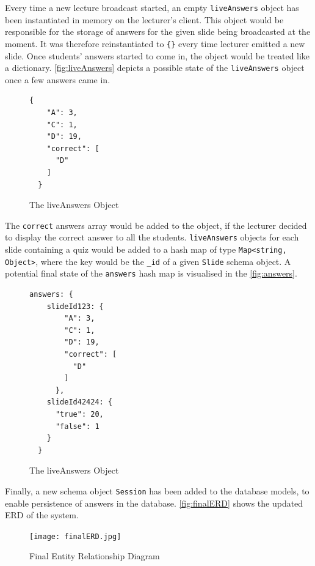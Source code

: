Every time a new lecture broadcast
started, an empty \texttt{liveAnswers} object has been instantiated in memory on the lecturer's
client. This object would be responsible for the storage of answers for the given slide
being broadcasted at the moment. It was therefore reinstantiated to \texttt{\{\}} every time
lecturer emitted a new slide. Once students' answers started to come in, the object would be treated
like a dictionary. \autoref{fig:liveAnswers} depicts a possible state of the \texttt{liveAnswers}
object once a few answers came in.

\begin{figure}[h!]
  \begin{lstlisting}[basicstyle=\small]
  {
    "A": 3,
    "C": 1,
    "D": 19,
    "correct": [
      "D"
    ]
  }
  \end{lstlisting}
  \caption{The liveAnswers Object}
  \label{fig:liveAnswers}
\end{figure}

The \texttt{correct} answers array would be added to the object, if the lecturer decided to
display the correct answer to all the students. \texttt{liveAnswers} objects for each
slide containing a quiz would be added to a hash map of type \texttt{Map<string, Object>}, where
the key would be the \texttt{\_id} of a given \texttt{Slide} schema object. A potential
final state of the \texttt{answers} hash map is visualised in the \autoref{fig:answers}.

\begin{figure}[h!]
  \begin{lstlisting}[basicstyle=\small]
  answers: {
    slideId123: {
        "A": 3,
        "C": 1,
        "D": 19,
        "correct": [
          "D"
        ]
      },
    slideId42424: {
      "true": 20,
      "false": 1
    }
  }
  \end{lstlisting}
  \caption{The liveAnswers Object}
  \label{fig:answers}
\end{figure}

\newpage
Finally, a new schema object \texttt{Session} has been added to the database models,
to enable persistence of answers in the database. \autoref{fig:finalERD} shows the
updated ERD of the system.

\begin{figure}[h!]
    \centering
    \texttt{[image: finalERD.jpg]}
    \caption{Final Entity Relationship Diagram}
    \label{fig:finalERD}
\end{figure}


